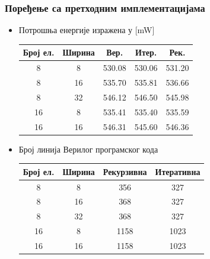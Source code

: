\begin{frame}%
\frametitle{Поређење са претходним имплементацијама}
 \begin{itemize}
 \item Потрошња енергије изражена у [mW]
 \begin{table}[H]
\footnotesize
\centering
 \begin{tabular}{| c | c | c c c |}
  \hline
  Број ел. & Ширина & Вер. & Итер. & Рек. \\
  \hline
  8 & 8  & 530.08 & 530.06 & 531.20 \\
  8 & 16 & 535.70 & 535.81 & 536.66 \\
  8 & 32 & 546.12 & 546.50 & 545.98 \\
  \hline
  16 & 8 & 535.41 & 535.40 & 535.59 \\
  16 & 16 & 546.31 & 545.60 & 546.36 \\
  \hline
 \end{tabular}
 \label{tab:potrosnja}
\end{table}

 \item Број линија Верилог програмског кода
 \begin{table}[H]
  \footnotesize
  \centering
  \begin{tabular}{| c | c | c c |}
    \hline
    Број ел. & Ширина & Рекурзивна & Итеративна \\
    \hline
    8 & 8  & 356 & 327 \\
    8 & 16 & 368 & 327 \\
    8 & 32 & 368 & 327 \\
    \hline
    16 & 8 & 1158 & 1023 \\
    16 & 16 & 1158 & 1023 \\
    \hline
  \end{tabular}
  \end{table}

 \end{itemize}
\end{frame}

